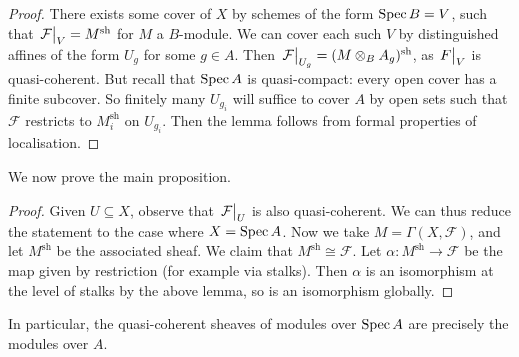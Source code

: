 \begin{proof}
    There exists some cover of \( X \) by schemes of the form \( \operatorname{Spec} B = V \), such that \( \eval{\mathcal F}_V = M^{\mathrm{sh}} \) for \( M \) a \( B \)-module.
    We can cover each such \( V \) by distinguished affines of the form \( U_g \) for some \( g \in A \).
    Then \( \eval{\mathcal F}_{U_g} = (M \otimes_B A_g)^{\mathrm{sh}} \), as \( \eval{F}_V \) is quasi-coherent.
    But recall that \( \operatorname{Spec} A \) is quasi-compact: every open cover has a finite subcover.
    So finitely many \( U_{g_i} \) will suffice to cover \( A \) by open sets such that \( \mathcal F \) restricts to \( M_i^{\mathrm{sh}} \) on \( U_{g_i} \).
    Then the lemma follows from formal properties of localisation.
\end{proof}
We now prove the main proposition.
\begin{proof}
    Given \( U \subseteq X \), observe that \( \eval{\mathcal F}_U \) is also quasi-coherent.
    We can thus reduce the statement to the case where \( X = \operatorname{Spec} A \).
    Now we take \( M = \Gamma(X, \mathcal F) \), and let \( M^{\mathrm{sh}} \) be the associated sheaf.
    We claim that \( M^{\mathrm{sh}} \cong \mathcal F \).
    Let \( \alpha : M^{\mathrm{sh}} \to \mathcal F \) be the map given by restriction (for example via stalks).
    Then \( \alpha \) is an isomorphism at the level of stalks by the above lemma, so is an isomorphism globally.
\end{proof}
In particular, the quasi-coherent sheaves of modules over \( \operatorname{Spec} A \) are precisely the modules over \( A \).
